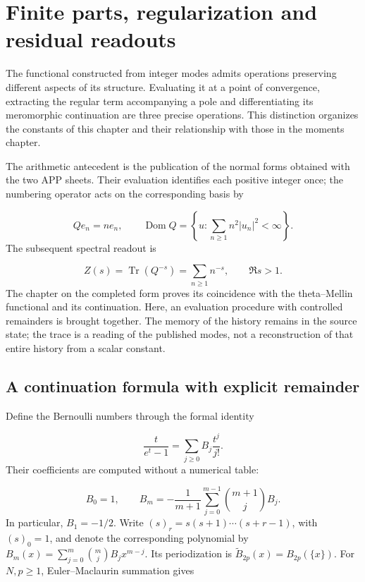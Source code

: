 \section{Finite parts, regularization and residual readouts}
\label{viii:lectura:manuscrito-04}
The functional constructed from integer modes admits operations preserving different aspects of its structure. Evaluating it at a point of convergence, extracting the regular term accompanying a pole and differentiating its meromorphic continuation are three precise operations. This distinction organizes the constants of this chapter and their relationship with those in the moments chapter.

The arithmetic antecedent is the publication of the normal forms obtained with the two APP sheets. Their evaluation identifies each positive integer once; the numbering operator acts on the corresponding basis by

\[
Qe_n=ne_n,\qquad
\operatorname{Dom}Q=\left\{u:\sum_{n\geq1}n^2|u_n|^2<\infty\right\}.
\]
The subsequent spectral readout is

\[
Z(s)=\operatorname{Tr}(Q^{-s})=\sum_{n\geq1}n^{-s},\qquad \Re s>1.
\]
The chapter on the completed form proves its coincidence with the theta–Mellin functional and its continuation. Here, an evaluation procedure with controlled remainders is brought together. The memory of the history remains in the source state; the trace is a reading of the published modes, not a reconstruction of that entire history from a scalar constant.

\subsection{A continuation formula with explicit remainder}
Define the Bernoulli numbers through the formal identity

\[
\frac{t}{e^t-1}=\sum_{j\geq0}B_j\frac{t^j}{j!}.
\]
Their coefficients are computed without a numerical table:

\[
B_0=1,\qquad
B_m=-\frac1{m+1}\sum_{j=0}^{m-1}\binom{m+1}{j}B_j.
\]
In particular, \(B_1=-1/2\). Write \((s)_r=s(s+1)\cdots(s+r-1)\), with \((s)_0=1\), and denote the corresponding polynomial by \(B_m(x)=\sum_{j=0}^m\binom mjB_jx^{m-j}\). Its periodization is \(\widetilde B_{2p}(x)=B_{2p}(\{x\})\). For \(N,p\geq1\), Euler–Maclaurin summation gives

